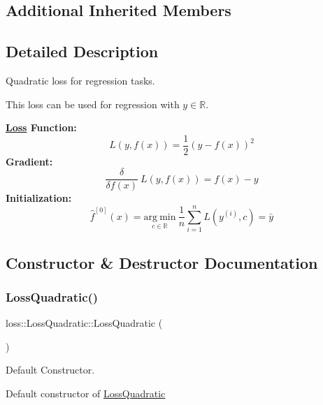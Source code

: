 \subsection*{Additional Inherited Members}


\subsection{Detailed Description}
Quadratic loss for regression tasks. 

This loss can be used for regression with $y \in \mathbb{R}$.

{\bfseries \mbox{\hyperlink{classloss_1_1_loss}{Loss}} Function\+:} \[ L(y, f(x)) = \frac{1}{2}\left( y - f(x) \right)^2 \] {\bfseries Gradient\+:} \[ \frac{\delta}{\delta f(x)}\ L(y, f(x)) = f(x) - y \] {\bfseries Initialization\+:} \[ \hat{f}^{[0]}(x) = \underset{c\in\mathbb{R}}{\mathrm{arg~min}}\ \frac{1}{n}\sum\limits_{i=1}^n L\left(y^{(i)}, c\right) = \bar{y} \] 

\subsection{Constructor \& Destructor Documentation}
\mbox{\label{classloss_1_1_loss_quadratic_ae1bc457d09db2e808cf7f4f80f92730a}} 
\subsubsection{\texorpdfstring{Loss\+Quadratic()}{LossQuadratic()}\hspace{0.1cm}{\footnotesize\ttfamily [1/2]}}
{\footnotesize\ttfamily loss\+::\+Loss\+Quadratic\+::\+Loss\+Quadratic (\begin{DoxyParamCaption}{ }\end{DoxyParamCaption})}



Default Constructor. 

Default constructor of {\ttfamily \mbox{\hyperlink{classloss_1_1_loss_quadratic}{Loss\+Quadratic}}} \mbox{\label{classloss_1_1_loss_quadratic_af3ac6ec45217231e7a0829c8501ccf1b}} 
